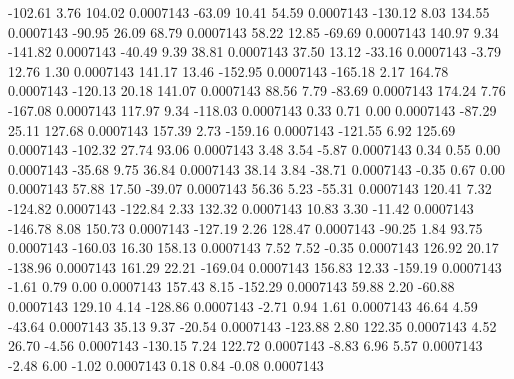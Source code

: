      -102.61        3.76      104.02     0.0007143
      -63.09       10.41       54.59     0.0007143
     -130.12        8.03      134.55     0.0007143
      -90.95       26.09       68.79     0.0007143
       58.22       12.85      -69.69     0.0007143
      140.97        9.34     -141.82     0.0007143
      -40.49        9.39       38.81     0.0007143
       37.50       13.12      -33.16     0.0007143
       -3.79       12.76        1.30     0.0007143
      141.17       13.46     -152.95     0.0007143
     -165.18        2.17      164.78     0.0007143
     -120.13       20.18      141.07     0.0007143
       88.56        7.79      -83.69     0.0007143
      174.24        7.76     -167.08     0.0007143
      117.97        9.34     -118.03     0.0007143
        0.33        0.71        0.00     0.0007143
      -87.29       25.11      127.68     0.0007143
      157.39        2.73     -159.16     0.0007143
     -121.55        6.92      125.69     0.0007143
     -102.32       27.74       93.06     0.0007143
        3.48        3.54       -5.87     0.0007143
        0.34        0.55        0.00     0.0007143
      -35.68        9.75       36.84     0.0007143
       38.14        3.84      -38.71     0.0007143
       -0.35        0.67        0.00     0.0007143
       57.88       17.50      -39.07     0.0007143
       56.36        5.23      -55.31     0.0007143
      120.41        7.32     -124.82     0.0007143
     -122.84        2.33      132.32     0.0007143
       10.83        3.30      -11.42     0.0007143
     -146.78        8.08      150.73     0.0007143
     -127.19        2.26      128.47     0.0007143
      -90.25        1.84       93.75     0.0007143
     -160.03       16.30      158.13     0.0007143
        7.52        7.52       -0.35     0.0007143
      126.92       20.17     -138.96     0.0007143
      161.29       22.21     -169.04     0.0007143
      156.83       12.33     -159.19     0.0007143
       -1.61        0.79        0.00     0.0007143
      157.43        8.15     -152.29     0.0007143
       59.88        2.20      -60.88     0.0007143
      129.10        4.14     -128.86     0.0007143
       -2.71        0.94        1.61     0.0007143
       46.64        4.59      -43.64     0.0007143
       35.13        9.37      -20.54     0.0007143
     -123.88        2.80      122.35     0.0007143
        4.52       26.70       -4.56     0.0007143
     -130.15        7.24      122.72     0.0007143
       -8.83        6.96        5.57     0.0007143
       -2.48        6.00       -1.02     0.0007143
        0.18        0.84       -0.08     0.0007143
